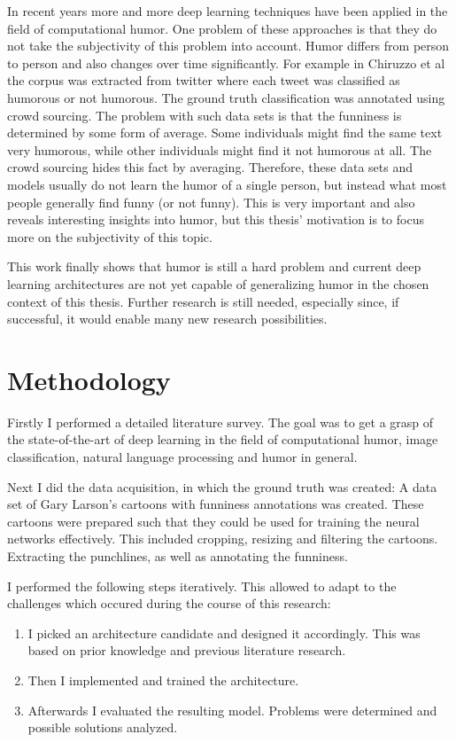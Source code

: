 \documentclass[draft,final,oneside]{vutinfth} %
\begin{document}
In recent years more and more deep learning techniques have been applied in the field of computational humor. One problem of these approaches is that they do not take the subjectivity of this problem into account. Humor differs from person to person and also changes over time significantly. For example in Chiruzzo et al \cite{chiruzzo2019overview} the corpus was extracted from twitter where each tweet was classified as humorous or not humorous. The ground truth classification was annotated using crowd sourcing. The problem with such data sets is that the funniness is determined by some form of average. Some individuals might find the same text very humorous, while other individuals might find it not humorous at all. The crowd sourcing hides this fact by averaging. Therefore, these data sets and models usually do not learn the humor of a single person, but instead what most people generally find funny (or not funny). This is very important and also reveals interesting insights into humor, but this thesis' motivation is to focus more on the subjectivity of this topic.

This work finally shows that humor is still a hard problem and current deep learning architectures are not yet capable of generalizing humor in the chosen context of this thesis. Further research is still needed, especially since, if successful, it would enable many new research possibilities.


\section{Methodology}

Firstly I performed a detailed literature survey. The goal was to get a grasp of the state-of-the-art of deep learning in the field of computational humor, image classification, natural language processing and humor in general.

Next I did the data acquisition, in which the ground truth was created: A data set of Gary Larson's cartoons with funniness annotations was created. These cartoons were prepared such that they could be used for training the neural networks effectively. This included cropping, resizing and filtering the cartoons. Extracting the punchlines, as well as annotating the funniness.

I performed the following steps iteratively. This allowed to adapt to the challenges which occured during the course of this research:

\begin{enumerate}

\item I picked an architecture candidate and designed it accordingly. This was based on prior knowledge and previous literature research.
\item Then I implemented and trained the architecture.
\item Afterwards I evaluated the resulting model. Problems were determined and possible solutions analyzed.

\end{enumerate}
\end{document}
